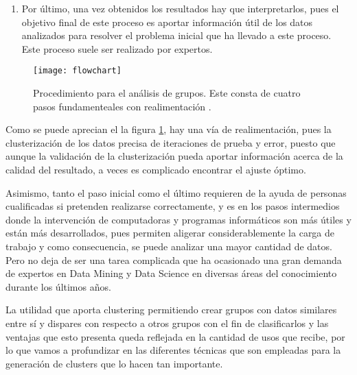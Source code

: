 \documentclass[10pt, a4paper]{article}
\begin{document}
\begin{enumerate}
  \item Por último, una vez obtenidos los resultados hay que interpretarlos, pues el objetivo final de este proceso es aportar información útil de los datos analizados para resolver el problema inicial que ha llevado a este proceso. Este proceso suele ser realizado por expertos.
\end{enumerate}

\begin{figure}[ht]
\centering
\texttt{[image: flowchart]}
\caption{Procedimiento para el análisis de grupos. Este consta de cuatro pasos fundamenteales con realimentación \cite{survey}.}
\label{fig:flowchart}
\end{figure}

Como se puede aprecian el la figura \ref{fig:flowchart}, hay una vía de realimentación, pues la clusterización de los datos precisa de iteraciones de prueba y error, puesto que aunque la validación de la clusterización pueda aportar información acerca de la calidad del resultado, a veces es complicado encontrar el ajuste óptimo.

Asimismo, tanto el paso inicial como el último requieren de la ayuda de personas cualificadas si pretenden realizarse correctamente, y es en los pasos intermedios donde la intervención de computadoras y programas informáticos son más útiles y están más desarrollados, pues permiten aligerar considerablemente la carga de trabajo y como consecuencia, se puede analizar una mayor cantidad de datos. Pero no deja de ser una tarea complicada que ha ocasionado una gran demanda de expertos en Data Mining y Data Science en diversas áreas del conocimiento durante los últimos años.

La utilidad que aporta clustering permitiendo crear grupos con datos similares entre sí y dispares con respecto a otros grupos con el fin de clasificarlos y las ventajas que esto presenta queda reflejada en la cantidad de usos que recibe, por lo que vamos a profundizar en las diferentes técnicas que son empleadas para la generación de clusters que lo hacen tan importante.



\end{document}
